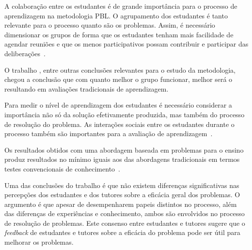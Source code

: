 A colaboração entre os estudantes é de grande importância para o
processo de aprendizagem na metodologia \ac{PBL}.
O agrupamento dos estudantes é tanto relevante para o processo quanto
são os problemas. Assim, é necessário dimensionar os grupos de forma
que os estudantes tenham mais facilidade de agendar reuniões e que
os menos participativos possam contribuir e participar das
deliberações~\cite{savery2015overview, albanese2010problem}.

O trabalho \cite{van2000motivation}, entre outras conclusões
relevantes para o estudo da metodologia, chegou a conclusão
que com quanto melhor o grupo funcionar, melhor será o
resultando em avaliações tradicionais de aprendizagem.

Para medir o nível de aprendizagem dos estudantes é necessário considerar
a importância não só da solução efetivamente produzida, mas também do
processo de resolução do problema.
As interações sociais entre os estudantes durante
o processo também são importantes para a
avaliação de aprendizagem~\cite{albanese2010problem}.

Os resultados obtidos com uma abordagem baseada em problemas para o ensino
produz resultados no mínimo iguais aos das abordagens tradicionais em
termos testes convencionais de conhecimento~\cite{savery2015overview}.


Uma das conclusões do trabalho \cite{sockalingam2011student} é que
não existem diferenças significativas nas percepções dos estudantes
e dos tutores sobre a eficácia geral dos problemas.
O argumento é que apesar de desempenharem papeis distintos
no processo, além das diferenças de experiências e conhecimento,
ambos são envolvidos no processo de resolução de problemas.
Este consenso entre estudantes e tutores sugere que o \textit{feedback} de estudantes
e tutores sobre a eficácia do problema pode ser útil para melhorar
os problemas.
